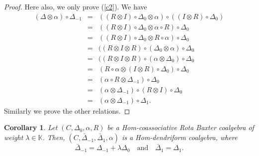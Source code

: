 \documentclass{article}
\newtheorem{cor}[thm]{Corollary}
\theoremstyle{definition}
\theoremstyle{remark}
\numberwithin{equation}{section}
\begin{document}
 \begin{proof}
  Here also, we only prove (\ref{c2}). We have 
 \begin{eqnarray}
  (\Delta\otimes\alpha)\circ\Delta_{-1}
 &=&((R\otimes I)\circ\Delta_0\otimes\alpha)\circ((I\otimes R)\circ\Delta_0)\nonumber\\
 &=&((R\otimes I)\circ\Delta_0\otimes\alpha\circ R)\circ\Delta_0\nonumber\\
 &=&((R\otimes I)\circ\Delta_0\otimes R\circ\alpha)\circ\Delta_0\nonumber\\
 &=&((R\otimes I\otimes R)\circ(\Delta_0\otimes\alpha)\circ\Delta_0\nonumber\\
 &=&((R\otimes I\otimes R)\circ(\alpha\otimes\Delta_0)\circ\Delta_0\nonumber\\
 &=&(R\circ\alpha\otimes(I\otimes R)\circ\Delta_0)\circ\Delta_0\nonumber\\
 &=&(\alpha\circ R\otimes \Delta_{-1})\circ\Delta_0\nonumber\\
 &=&(\alpha\otimes\Delta_{-1})\circ(R\otimes I)\circ\Delta_0\nonumber\\
 &=&(\alpha\otimes\Delta_{-1})\circ\Delta_1.\nonumber
 \end{eqnarray}
 Similarly we prove the other relations.
 \end{proof}
 
 \begin{cor}
  Let $(C, \Delta_0, \alpha, R)$ be a Hom-coassociative Rota Baxter coalgebra of weight $\lambda\in\mathbb{K}$. Then,
 $(C, \bar\Delta_{-1}, \bar\Delta_1, \alpha)$ is a Hom-dendriform coalgebra, where
 $$\bar\Delta_{-1}=\Delta_{-1}+\lambda\Delta_{0}\quad\mbox{and}\quad \bar\Delta_{1}=\Delta_{1}.$$
 \end{cor}
 
\end{document}
